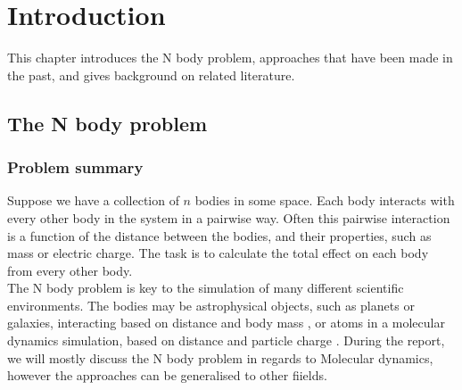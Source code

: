 \documentclass[pdftex,twoside,a4paper]{report}
\newcommand{\pmem}{Particle Mesh Ewald method}
\newcommand{\fma}{Fast Multipole Algorithm}
\begin{document}
\begin{abstract}
The N body problem is common across the fields of physics, biology and chemistry. The classic solution to this problem has an inhibitive complexity in the class $O(n^2)$. This project examines two competing algorithms: The Fast Multipole Algorithm, and the Particle Mesh Ewald Method, with better complexities of $O(n)$ and $O(n \text{log}(n))$, respectively. These algorithms were implemented in Java, and their efficiencies were discussed and compared. The algorithms were run over typical molecular dynamics simulations to determine the most efficient algorithm for the N-body problem. It was found that the \fma{} was the most efficient algorithm for this architecture and implementation, but the \pmem{} may be preferable in high perfomance parallel applications. The algorithms and their advantages / disadvantages were discussed in detail.
\end{abstract}

\tableofcontents

\chapter{Introduction}
This chapter introduces the N body problem, approaches that have been made in the past, and gives background on related literature.
\section{The N body problem}
    \subsection{Problem summary}
    Suppose we have a collection of $n$ bodies in some space. Each body interacts with every other body in the system in a pairwise way. Often this pairwise interaction is a function of the distance between the bodies, and their properties, such as mass or electric charge. The task is to calculate the total effect on each body from every other body.\\
    
    The N body problem is key to the simulation of many different scientific environments. The bodies may be astrophysical objects, such as planets or galaxies, interacting based on distance and body mass \cite{MilleniumRun}, or atoms in a molecular dynamics simulation, based on distance and particle charge \cite{NAMD}. During the report, we will mostly discuss the N body problem in regards to Molecular dynamics, however the approaches can be generalised to other fiields.
\end{document}
